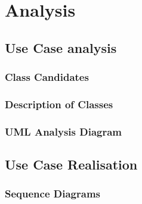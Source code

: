 \section{Analysis}

\subsection{Use Case analysis}

\subsubsection{Class Candidates}

\subsubsection{Description of Classes}

\subsubsection{UML Analysis Diagram}

\subsection{Use Case Realisation}

\subsubsection{Sequence Diagrams}


